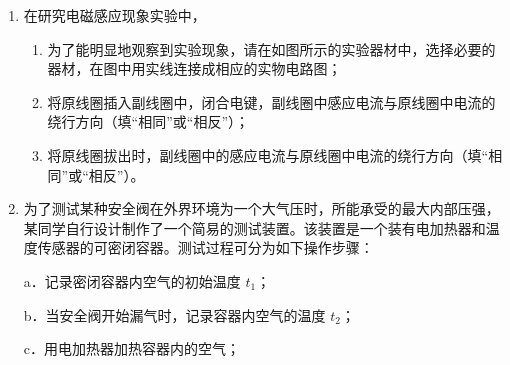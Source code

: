\documentclass[\gkver]{gaokaozhenti}
\begin{document}
\begin{enumerate}

\item
在研究电磁感应现象实验中，

\begin{enumerate}
	\item
	为了能明显地观察到实验现象，请在如图所示的实验器材中，选择必要的器材，在图中用实线连接成相应的实物电路图；
	\item
	将原线圈插入副线圈中，闭合电键，副线圈中感应电流与原线圈中电流的绕行方向（填“相同”或“相反”）；
	\item
	将原线圈拔出时，副线圈中的感应电流与原线圈中电流的绕行方向（填“相同”或“相反”）。
\end{enumerate}




\item
为了测试某种安全阀在外界环境为一个大气压时，所能承受的最大内部压强，某同学自行设计制作了一个简易的测试装置。该装置是一个装有电加热器和温度传感器的可密闭容器。测试过程可分为如下操作步骤：

a．记录密闭容器内空气的初始温度 $t_{1}$；

b．当安全阀开始漏气时，记录容器内空气的温度 $t_{2}$；

c．用电加热器加热容器内的空气；


\end{enumerate}
\end{document}
